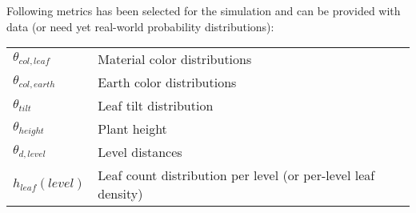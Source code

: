 Following metrics has been selected for the simulation and can be provided with data (or need yet real-world probability distributions):\\

\begin{center}
    \begin{tabular}{ |l|l| }
        \hline
        $\theta_{col,leaf}$ & Material color distributions \\
        $\theta_{col,earth}$ & Earth color distributions  \\
        $\theta_{tilt}$ & Leaf tilt distribution  \\
        $\theta_{height}$ & Plant height  \\
        $\theta_{d,level}$ & Level distances  \\
        $h_{leaf}(level)$ & Leaf count distribution per level (or per-level leaf density) \\
        \hline
    \end{tabular}
\end{center}